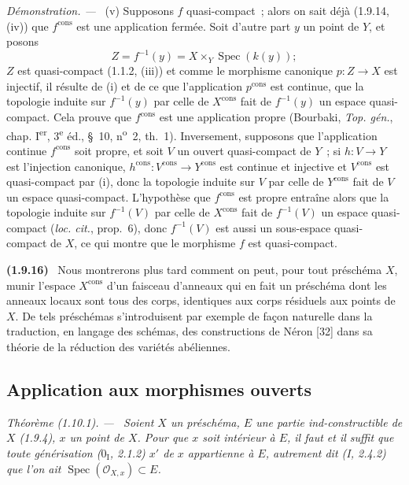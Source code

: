 \documentclass[10pt,oneside]{book}
\makeatletter
\newcommand{\setmanualcurrentlabel}[1]{\def\@currentlabel{#1}}
\newcommand{\oldpage}[2][]{%
  \setcounter{footnote}{0}%
  \marginpar{\scriptsize\textbf{#1}~|~#2}\ignorespaces}
\newenvironment{env}[1][]{\setmanualcurrentlabel{#1}\par\medskip\noindent\textbf{(#1)}\ }{\par}
\newenvironment{theorem}[1][]{%
  \setmanualcurrentlabel{#1}\par\medskip\noindent\itshape Théorème (#1). ---\ }{\par}
\newenvironment{proof}{%
  \par\medskip\noindent\textit{Démonstration. ---\ }}{\par}
\makeatother
\begin{document}
\begin{proof}
(v) Supposons $f$ quasi-compact~; alors on sait déjà (1.9.14, (iv)) que
$f^{\mathrm{cons}}$ est une application fermée. Soit d'autre part $y$ un
point de $Y$, et posons
\[
  Z=f^{-1}(y)=X\times_Y\operatorname{Spec}(k(y));
\]
$Z$ est quasi-compact (1.1.2, (iii)) et comme le morphisme canonique
$p:Z\to X$ est injectif, il résulte de (i) et de ce que l'application
$p^{\mathrm{cons}}$ est continue, que la topologie induite sur $f^{-1}(y)$
par celle de $X^{\mathrm{cons}}$ fait de $f^{-1}(y)$ un espace quasi-compact.
Cela prouve que $f^{\mathrm{cons}}$ est une application propre (Bourbaki,
\emph{Top. gén.}, chap. I\textsuperscript{er}, 3\textsuperscript{e} éd.,
\S~10, n\textsuperscript{o}~2, th.~1). Inversement, supposons que
l'application continue $f^{\mathrm{cons}}$ soit propre, et soit $V$ un ouvert
quasi-compact de $Y$~; si $h:V\to Y$ est l'injection canonique,
$h^{\mathrm{cons}}:V^{\mathrm{cons}}\to Y^{\mathrm{cons}}$ est continue et
injective et $V^{\mathrm{cons}}$ est quasi-compact par (i), donc la topologie
induite sur $V$ par celle de $Y^{\mathrm{cons}}$ fait de $V$ un espace
quasi-compact. L'hypothèse que $f^{\mathrm{cons}}$ est propre entraîne alors
que la topologie induite sur $f^{-1}(V)$ par celle de $X^{\mathrm{cons}}$ fait
de $f^{-1}(V)$ un espace quasi-compact (\emph{loc. cit.}, prop.~6), donc
$f^{-1}(V)$ est aussi un sous-espace quasi-compact de $X$, ce qui montre que
le morphisme $f$ est quasi-compact.
\end{proof}

\begin{env}[1.9.16]
\label{IV.1.9.16-fr}
Nous montrerons plus tard comment on peut, pour tout préschéma $X$, munir
l'espace $X^{\mathrm{cons}}$ d'un faisceau d'anneaux qui en fait un préschéma
dont les anneaux locaux sont tous des corps, identiques aux corps résiduels aux
points de $X$. De tels préschémas s'introduisent par exemple de façon naturelle
dans la traduction, en langage des schémas, des constructions de
Néron [32] dans sa théorie de la réduction des variétés abéliennes.
\end{env}

\oldpage[IV-1]{249}

\subsection{Application aux morphismes ouverts}
\label{subsection:IV.1.10-fr}

\begin{theorem}[1.10.1]
\label{IV.1.10.1-fr}
Soient $X$ un préschéma, $E$ une partie ind-constructible de $X$ (1.9.4), $x$
un point de $X$. Pour que $x$ soit intérieur à $E$, il faut et il suffit que
toute générisation ($0_{\mathrm I}$, 2.1.2) $x'$ de $x$ appartienne à $E$,
autrement dit (I, 2.4.2) que l'on ait
$\operatorname{Spec}(\mathcal O_{X,x})\subset E$.
\end{theorem}
\end{document}
